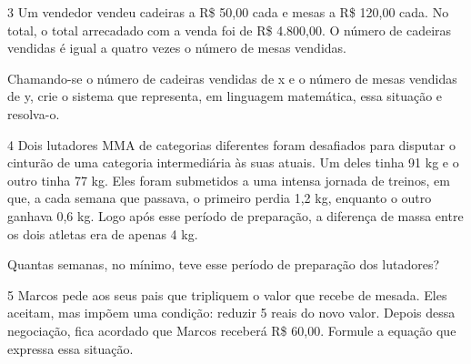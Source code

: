 {{{

\num{3} Um vendedor vendeu cadeiras a R\$ 50,00 cada e mesas a R\$ 120,00
cada. No total, o total arrecadado com a venda foi de R\$ 4.800,00. O número 
de cadeiras vendidas é igual a quatro vezes o número de mesas vendidas.

Chamando-se o número de cadeiras vendidas de x e o número de mesas
vendidas de y, crie o sistema que representa, em linguagem
matemática, essa situação e resolva-o.




\num{4} Dois lutadores MMA de categorias diferentes foram desafiados para
disputar o cinturão de uma categoria intermediária às suas atuais. Um
deles tinha 91 kg e o outro tinha 77 kg. Eles foram submetidos a uma
intensa jornada de treinos, em que, a cada semana que passava, o primeiro
perdia 1,2 kg, enquanto o outro ganhava 0,6 kg. Logo após esse período de
preparação, a diferença de massa entre os dois atletas era de apenas 4 kg.

Quantas semanas, no mínimo, teve esse período de preparação dos
lutadores?


\num{5} Marcos pede aos seus pais que tripliquem o valor que recebe de mesada.
Eles aceitam, mas impõem uma condição: reduzir 5 reais do novo valor. Depois 
dessa negociação, fica acordado que Marcos receberá R\$ 60,00. 
Formule a equação que expressa essa situação.

}}}
